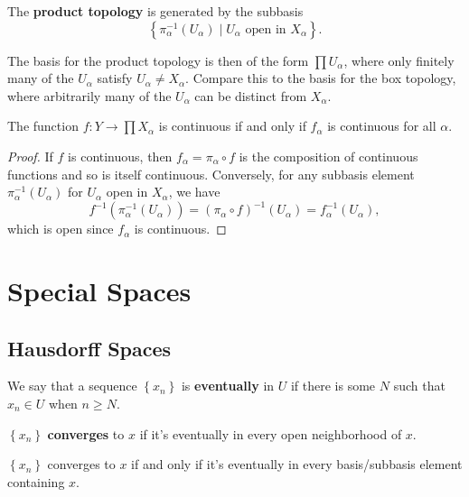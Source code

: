 \documentclass[twoside,10pt]{report}
\begin{document}
\begin{defn}[]
The \textbf{product topology} is generated by the subbasis
\[
	\left\{ \pi_{\alpha}^{-1}(U_{\alpha}) \;|\; U_{\alpha} \text{ open in } X _{\alpha} \right\}.
\]
\end{defn}
The basis for the product topology is then of the form $\prod U_{\alpha}$, where only finitely many of the $U_{\alpha}$ satisfy $U_{\alpha}\neq X_{\alpha}$. Compare this to the basis for the box topology, where arbitrarily many of the $U_{\alpha}$ can be distinct from $X_{\alpha}$.

\begin{prop}
The function $f:Y\to \prod X_{\alpha}$ is continuous if and only if $f_{\alpha}$ is continuous for all $\alpha$.
\end{prop}
\begin{proof}
	If $f$ is continuous, then $f_{\alpha}=\pi_{\alpha} \circ f$ is the composition of continuous functions and so is itself continuous. Conversely, for any subbasis element $\pi^{-1}_{\alpha}(U_{\alpha})$ for $U_{\alpha}$ open in $X_{\alpha}$, we have
	\[
		f^{-1}(\pi_{\alpha}^{-1}(U_{\alpha})) = (\pi_{\alpha} \circ f)^{-1}(U_{\alpha}) = f_{\alpha}^{-1}(U_{\alpha}),
	\] which is open since $f_{\alpha}$ is continuous.
\end{proof}


\chapter{Special Spaces}


\section{Hausdorff Spaces}

We say that a sequence $\left\{ x_n \right\}$ is \textbf{eventually} in $U$ if there is some $N$ such that $x_n \in U$ when $n \geq N$.

\begin{defn}[]
$\left\{ x_n \right\}$ \textbf{converges} to $x$ if it's eventually in every open neighborhood of $x$.
\end{defn}

\begin{prop}
$\left\{ x_{n} \right\}$ converges to $x$ if and only if it's eventually in every basis/subbasis element containing $x$.
\end{prop}
\end{document}
